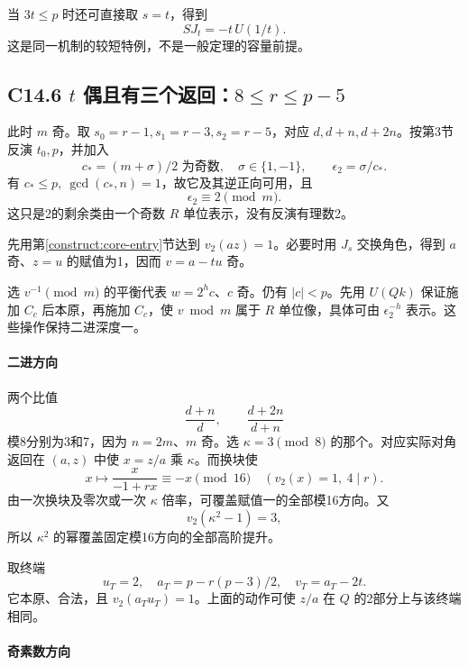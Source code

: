\documentclass[11pt,a4paper]{article}
\theoremstyle{definition}
\numberwithin{equation}{section}
\begin{document}
{当} \(3t\le p\) {时还可直接取} \(s=t\){，得到} \[
SJ_t=-t\,U(1/t).
\] {这是同一机制的较短特例，不是一般定理的容量前提。}

\subsection*{\texorpdfstring{{C14.6} \(t\) {偶且有三个返回：}\(8\le r\le p-5\)}{C14.6 t 偶且有三个返回：8\textbackslash le r\textbackslash le p-5}}\label{C14-h98}

{此时} \(m\) {奇。取} \(s_0=r-1,s_1=r-3,s_2=r-5\){，对应} \(d,d+n,d+2n\){。按第3节反演} \(t_0,p\){，并加入} \[
c_*=(m+\sigma)/2\text{ 为奇数},\quad \sigma\in\{1,-1\},\qquad
\epsilon_2=\sigma/c_*.
\] {有} \(c_*\le p,\ \gcd(c_*,n)=1\){，故它及其逆正向可用，且} \[
\epsilon_2\equiv2\pmod m.
\] {这只是2的剩余类由一个奇数} \(R\) {单位表示，没有反演有理数2。}

{先用}第\ref{construct:core-entry}节{达到} \(v_2(az)=1\){。必要时用} \(J_s\) {交换角色，得到} \(a\) {奇、}\(z=u\) {的赋值为1，因而} \(v=a-tu\) {奇。}

{选} \(v^{-1}\pmod m\) {的平衡代表} \(w=2^h c\){、}\(c\) {奇。仍有} \(|c|<p\){。先用} \(U(Qk)\) {保证施加} \(C_c\) {后本原，再施加} \(C_c\){，使} \(v\bmod m\) {属于} \(R\) {单位像，具体可由} \(\epsilon_2^{-h}\) {表示。这些操作保持二进深度一。}

\paragraph*{\texorpdfstring{{二进方向}}{二进方向}}\label{C14-h99}

{两个比值} \[
\frac{d+n}{d},\qquad\frac{d+2n}{d+n}
\] {模8分别为3和7，因为} \(n=2m\){、}\(m\) {奇。选} \(\kappa=3\pmod8\) {的那个。对应实际对角返回在} \((a,z)\) {中使} \(x=z/a\) {乘} \(\kappa\){。而换块使} \[
x\mapsto\frac{x}{-1+rx}\equiv-x\pmod{16}
\quad(v_2(x)=1,\ 4\mid r).
\] {由一次换块及零次或一次} \(\kappa\) {倍率，可覆盖赋值一的全部模16方向。又} \[
v_2(\kappa^2-1)=3,
\] {所以} \(\kappa^2\) {的幂覆盖固定模16方向的全部高阶提升。}

{取终端} \[
u_T=2,\quad a_T=p-r(p-3)/2,\quad v_T=a_T-2t.
\tag{C14.10}
\] {它本原、合法，且} \(v_2(a_Tu_T)=1\){。上面的动作可使} \(z/a\) {在} \(Q\) {的2部分上与该终端相同。}

\paragraph*{\texorpdfstring{{奇素数方向}}{奇素数方向}}\label{C14-h100}
\end{document}
